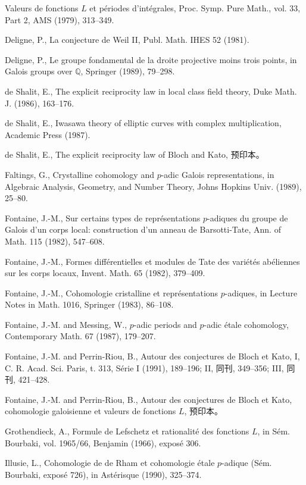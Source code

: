 \begin{description}[style=nextline,leftmargin=3.7em,labelwidth=3.2em,font=\normalfont\small,itemsep=.6em]
\item[{[De3]}] Valeurs de fonctions $L$ et périodes d'intégrales, Proc. Symp. Pure Math., vol. 33, Part 2, AMS (1979), 313--349.
\item[{[De4]}] Deligne, P., La conjecture de Weil II, Publ. Math. IHES 52 (1981).
\item[{[De5]}] Deligne, P., Le groupe fondamental de la droite projective moins trois points, in Galois groups over $\mathbb Q$, Springer (1989), 79--298.
\item[{[dS1]}] de Shalit, E., The explicit reciprocity law in local class field theory, Duke Math. J. (1986), 163--176.
\item[{[dS2]}] de Shalit, E., Iwasawa theory of elliptic curves with complex multiplication, Academic Press (1987).
\item[{[dS3]}] de Shalit, E., The explicit reciprocity law of Bloch and Kato, 预印本。
\item[{[Fa]}] Faltings, G., Crystalline cohomology and $p$-adic Galois representations, in Algebraic Analysis, Geometry, and Number Theory, Johns Hopkins Univ. (1989), 25--80.
\item[{[Fo1]}] Fontaine, J.-M., Sur certains types de représentations $p$-adiques du groupe de Galois d'un corps local: construction d'un anneau de Barsotti-Tate, Ann. of Math. 115 (1982), 547--608.
\item[{[Fo2]}] Fontaine, J.-M., Formes différentielles et modules de Tate des variétés abéliennes sur les corps locaux, Invent. Math. 65 (1982), 379--409.
\item[{[Fo3]}] Fontaine, J.-M., Cohomologie cristalline et représentations $p$-adiques, in Lecture Notes in Math. 1016, Springer (1983), 86--108.
\item[{[FM]}] Fontaine, J.-M. and Messing, W., $p$-adic periods and $p$-adic étale cohomology, Contemporary Math. 67 (1987), 179--207.
\item[{[FP1]}] Fontaine, J.-M. and Perrin-Riou, B., Autour des conjectures de Bloch et Kato, I, C. R. Acad. Sci. Paris, t. 313, Série I (1991), 189--196; II, 同刊, 349--356; III, 同刊, 421--428.
\item[{[FP2]}] Fontaine, J.-M. and Perrin-Riou, B., Autour des conjectures de Bloch et Kato, cohomologie galoisienne et valeurs de fonctions $L$, 预印本。
\item[{[Gr]}] Grothendieck, A., Formule de Lefschetz et rationalité des fonctions $L$, in Sém. Bourbaki, vol. 1965/66, Benjamin (1966), exposé 306.
\item[{[Il]}] Illusie, L., Cohomologie de de Rham et cohomologie étale $p$-adique (Sém. Bourbaki, exposé 726), in Astérisque (1990), 325--374.

\end{description}
